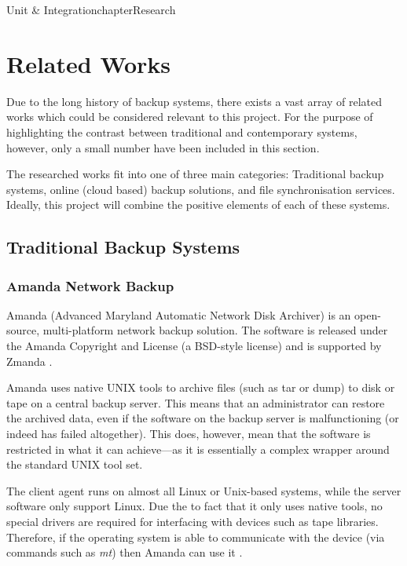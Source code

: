 Unit \& Integrationchapter{Research}

\section{Related Works}

Due to the long history of backup systems, there exists a vast array of related
works which could be considered relevant to this project. For the purpose of
highlighting the contrast between traditional and contemporary systems,
however, only a small number have been included in this section.

The researched works fit into one of three main categories: Traditional backup
systems, online (cloud based) backup solutions, and file synchronisation
services. Ideally, this project will combine the positive elements of each of
these systems.

\subsection{Traditional Backup Systems}

\subsubsection{Amanda Network Backup}

Amanda (Advanced Maryland Automatic Network Disk Archiver) is an open-source,
multi-platform network backup solution\cite{AMANDA-about}. The software is
released under the Amanda Copyright and License (a BSD-style license) and is
supported by Zmanda \cite{AMANDA-license}.

Amanda uses native UNIX tools to archive files (such as tar or dump) to disk or
tape on a central backup server. This means that an administrator can restore
the archived data, even if the software on the backup server is malfunctioning
(or indeed has failed altogether). This does, however, mean that the software
is restricted in what it can achieve---as it is essentially a complex wrapper
around the standard UNIX tool set.

The client agent runs on almost all Linux or Unix-based systems, while the
server software only support Linux. Due the to fact that it only uses native
tools, no special drivers are required for interfacing with devices such as
tape libraries. Therefore, if the operating system is able to communicate with
the device (via commands such as \emph{mt}) then Amanda can use
it \cite{AMANDA-about}.


